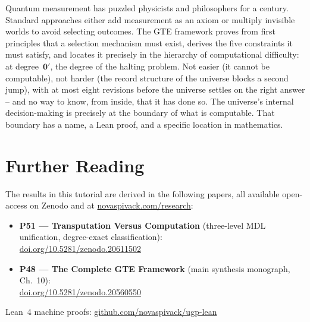 \documentclass[11pt,a4paper]{article}
\newcommand{\zerp}{\mathbf{0}'}
\begin{document}
\bigskip
\begin{tcolorbox}[colback=boxgray,colframe=gray!50,
  title={One-Paragraph Coda}]
Quantum measurement has puzzled physicists and philosophers for a century.
Standard approaches either add measurement as an axiom or multiply invisible
worlds to avoid selecting outcomes. The GTE framework proves from first
principles that a selection mechanism must exist, derives the five constraints
it must satisfy, and locates it precisely in the hierarchy of computational
difficulty: at degree~$\zerp$, the degree of the halting problem.
Not easier (it cannot be computable), not harder (the record structure of the
universe blocks a second jump), with at most eight revisions before the
universe settles on the right answer -- and no way to know, from inside, that
it has done so.
The universe's internal decision-making is precisely at the boundary of what
is computable. That boundary has a name, a Lean proof, and a specific location
in mathematics.
\end{tcolorbox}


\section*{Further Reading}
\begin{tcolorbox}[colback=orange!8,colframe=orange!50!black,
  title=\textbf{Primary Sources}]
The results in this tutorial are derived in the following papers,
all available open-access on Zenodo and at
\href{https://novaspivack.com/research}{novaspivack.com/research}:
\begin{itemize}
  \item \textbf{P51 --- Transputation Versus Computation} (three-level MDL unification,
        degree-exact classification):\\
        \href{https://doi.org/10.5281/zenodo.20611502}{doi.org/10.5281/zenodo.20611502}
  \item \textbf{P48 --- The Complete GTE Framework} (main synthesis monograph, Ch.~10):\\
        \href{https://doi.org/10.5281/zenodo.20560550}{doi.org/10.5281/zenodo.20560550}
\end{itemize}
Lean~4 machine proofs: \href{https://github.com/novaspivack/ugp-lean}{github.com/novaspivack/ugp-lean}
\end{tcolorbox}


\end{document}
